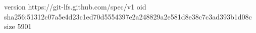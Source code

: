 version https://git-lfs.github.com/spec/v1
oid sha256:51312c07a5e4d23c1ed70d5554397e2a248829a2e581d8e38c7c3ad393b1d08c
size 5901
